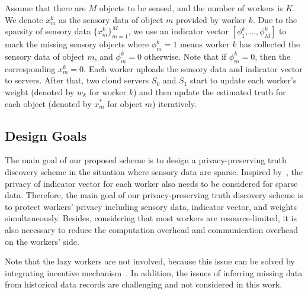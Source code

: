 \documentclass[conference]{IEEEtran}
\begin{document}
Assume that there are $M$ objects to be sensed, and the number of workers is $K$.
We denote $x_m^k$ as the sensory data of object $m$ provided by worker $k$.
Due to the sparsity of sensory data $\{x_m^k\}_{m=1}^M$, we use an indicator vector $[\phi_1^k, \ldots, \phi_M^k]$ to mark the missing sensory objects where $\phi_m^k = 1$ means worker $k$ has collected the sensory data of object $m$, and $\phi_m^k = 0$ otherwise.
Note that if $\phi_m^k = 0$, then the corresponding $x_m^k = 0$.
Each worker uploads the sensory data and indicator vector to servers.
After that, two cloud servers $S_0$ and $S_1$ start to update each worker's weight (denoted by $w_k$ for worker $k$) and then update the estimated truth for each object (denoted by $x_m^*$ for object $m$) iteratively. 

\subsection{Design Goals}
The main goal of our proposed scheme is to design a privacy-preserving truth discovery scheme in the situation where sensory data are sparse.
Inspired by~\cite{wang_sparse_2020}, the privacy of indicator vector for each worker also needs to be considered for sparse data.
Therefore, the main goal of our privacy-preserving truth discovery scheme is to protect workers' privacy including sensory data, indicator vector, and weights simultaneously.
Besides, considering that most workers are resource-limited, it is also necessary to reduce the computation overhead and communication overhead on the workers' side.

Note that the lazy workers are not involved, because this issue can be solved by integrating incentive mechanism~\cite{xue_inpptd_2020}.
In addition, the issues of inferring missing data from historical data records are challenging and not considered in this work.
\end{document}
